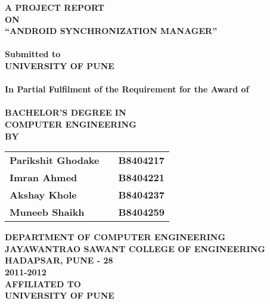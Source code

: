 \newpage
\begin{center}
\thispagestyle{empty}
\Large{\textbf{A PROJECT REPORT\\ \large{ON}}}\\[0.7cm]
\LARGE{\textsc {\textbf{``ANDROID SYNCHRONIZATION MANAGER''}}}\\[0.5cm]
\vspace{0.5cm}
\Large{\textbf{\\Submitted to}}
\LARGE{\textbf{\\UNIVERSITY OF PUNE\\}}
\vspace{1cm}
\Large{\textbf{\\In Partial Fulfilment of the Requirement for the Award of\\}}
\Large{\textbf{\\BACHELOR'S DEGREE IN\\COMPUTER ENGINEERING}}
\vspace{1cm}
\Large{\textbf{\\BY}}\\[0.5cm]
\begin{table}[h]
\centering
\Large{
\begin{tabular}{>{\bfseries}lc>{\bfseries}r}
Parikshit Ghodake & & B8404217\\Imran Ahmed & & B8404221\\Akshay Khole & & B8404237\\Muneeb Shaikh & & B8404259\\
\end{tabular}}
\end{table}
\vspace{1cm}
\large{\textbf{DEPARTMENT OF COMPUTER ENGINEERING}}\\
\Large{\textbf{JAYAWANTRAO SAWANT COLLEGE OF ENGINEERING}}\\
\large{\textbf{HADAPSAR, PUNE - 28}}
\large{\textbf{\\2011-2012}}\\[0.5cm]
\vspace{1cm}
\Large{\textbf{AFFILIATED TO\\}}
\LARGE{\textbf{UNIVERSITY OF PUNE}}
\newpage
\end{center}
